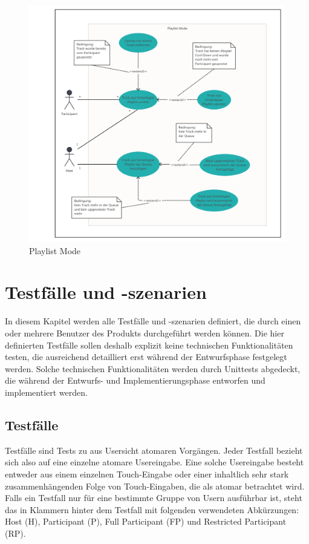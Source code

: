 \documentclass[oneside, ngerman]{sdqtechreport}
\begin{document}
\begin{figure}[h]
    \includegraphics[width = 16cm]{LATEX/Pflichtenheft/GraphicDesigns/Use Case Playlist Mode.png}
    \caption{Playlist Mode}
    \label{fig:Use Case Playlist Mode}
\end{figure}



\chapter{Testfälle und -szenarien}
\label{chap:Tests}

In diesem Kapitel werden alle Testfälle und -szenarien definiert, die durch einen oder mehrere Benutzer des Produkts durchgeführt werden können. Die hier definierten Testfälle sollen deshalb explizit keine technischen Funktionalitäten testen, die ausreichend detailliert erst während der Entwurfsphase festgelegt werden. Solche technischen Funktionalitäten werden durch Unittests abgedeckt, die während der Entwurfs- und Implementierungsphase entworfen und implementiert werden.

\section{Testfälle}
\label{sec:Tests:Testfälle}

Testfälle sind Tests zu aus Usersicht atomaren Vorgängen. Jeder Testfall bezieht sich also auf eine einzelne atomare Usereingabe. Eine solche Usereingabe besteht entweder aus einem einzelnen Touch-Eingabe oder einer inhaltlich sehr stark zusammenhängenden Folge von Touch-Eingaben, die als atomar betrachtet wird. Falls ein Testfall nur für eine bestimmte Gruppe von Usern ausführbar ist, steht das in Klammern hinter dem Testfall mit folgenden verwendeten Abkürzungen: Host (H), Participant (P), Full Participant (FP) und Restricted Participant (RP).
\end{document}
